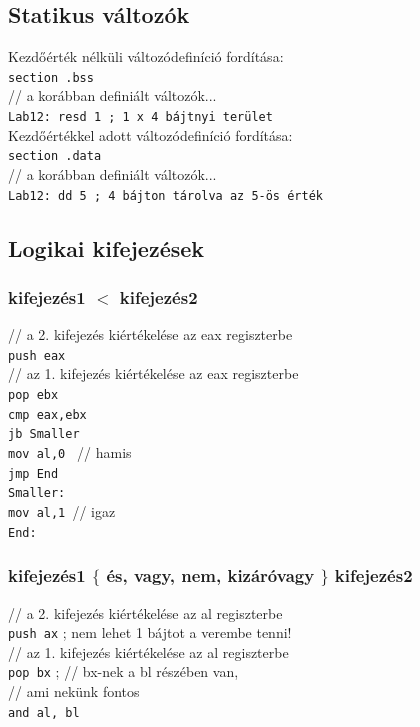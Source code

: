 \documentclass[12pt,margin=0px]{article}
\begin{document}
\subsection*{Statikus változók}
	
	Kezdőérték nélküli változódefiníció fordítása:\\

	\noindent \texttt{section .bss}\\
    // a korábban definiált változók...\\
    \texttt{Lab12: resd 1 ; 1 x 4 bájtnyi terület}\\
	
	\noindent Kezdőértékkel adott változódefiníció fordítása:\\

	\noindent \texttt{section .data}\\
	// a korábban definiált változók...\\
	\texttt{Lab12: dd 5 ; 4 bájton tárolva az 5-ös érték}

    \subsection*{Logikai kifejezések}

    \subsubsection*{kifejezés1 $ < $  kifejezés2 }
	
	// a 2. kifejezés kiértékelése az eax regiszterbe\\
	\texttt{push eax}\\
	// az 1. kifejezés kiértékelése az eax regiszterbe\\
	\texttt{pop ebx\\
	cmp eax,ebx\\
	jb Smaller\\
	mov al,0 } // hamis\\
	\texttt{jmp End\\
	Smaller:\\
	mov al,1 }// igaz\\
	\texttt{End:}
\newpage
    \subsubsection*{kifejezés1 $ \lbrace $ és, vagy, nem, kizáróvagy  $ \rbrace $  kifejezés2 }

	// a 2. kifejezés kiértékelése az al regiszterbe\\
	\texttt{push ax} ; nem lehet 1 bájtot a verembe tenni!\\
	// az 1. kifejezés kiértékelése az al regiszterbe\\
	\texttt{pop bx} ; // bx-nek a bl részében van,\\
	// ami nekünk fontos\\
	\texttt{and al, bl}\\
	
\end{document}
